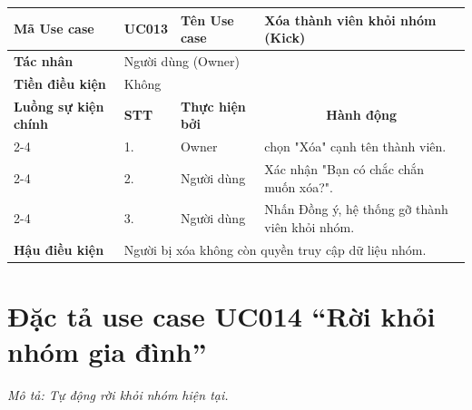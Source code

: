 \begingroup
\renewcommand{\arraystretch}{1.5}

\begin{longtable}{|p{2.7cm}|p{0.8cm}|p{2.6cm}|p{7.3cm}|}
\hline
\cellcolor[HTML]{D5F5E3}\textbf{Mã Use case} & \multicolumn{1}{l|}{UC013} & \cellcolor[HTML]{D5F5E3}\textbf{Tên Use case} & Xóa thành viên khỏi nhóm (Kick) \\ \hline
\cellcolor[HTML]{D5F5E3}\textbf{Tác nhân} & \multicolumn{3}{p{10.7cm}|}{Người dùng (Owner)} \\ \hline
\cellcolor[HTML]{D5F5E3}\textbf{Tiền điều kiện} & \multicolumn{3}{p{10.7cm}|}{Không} \\ \hline

\cellcolor[HTML]{D5F5E3}\textbf{Luồng sự kiện chính} & \cellcolor[HTML]{FDEBD0}\textbf{STT} & \cellcolor[HTML]{FDEBD0}\textbf{Thực hiện bởi} & \multicolumn{1}{c|}{\cellcolor[HTML]{FDEBD0}\textbf{Hành động}} \\ \cline{2-4} 
\cellcolor[HTML]{D5F5E3} & 1. & Owner & chọn "Xóa" cạnh tên thành viên. \\ \cline{2-4} 
\cellcolor[HTML]{D5F5E3} & 2. & Người dùng & Xác nhận "Bạn có chắc chắn muốn xóa?". \\ \cline{2-4} 
\cellcolor[HTML]{D5F5E3} & 3. & Người dùng & Nhấn Đồng ý, hệ thống gỡ thành viên khỏi nhóm. \\ \hline

\cellcolor[HTML]{D5F5E3}\textbf{Hậu điều kiện} & \multicolumn{3}{p{10.7cm}|}{Người bị xóa không còn quyền truy cập dữ liệu nhóm.} \\ \hline
\end{longtable}
\endgroup

\section{Đặc tả use case UC014 ``Rời khỏi nhóm gia đình''}
\textit{Mô tả: Tự động rời khỏi nhóm hiện tại.}
\vspace{0.5cm}

\begingroup
\renewcommand{\arraystretch}{1.5}

